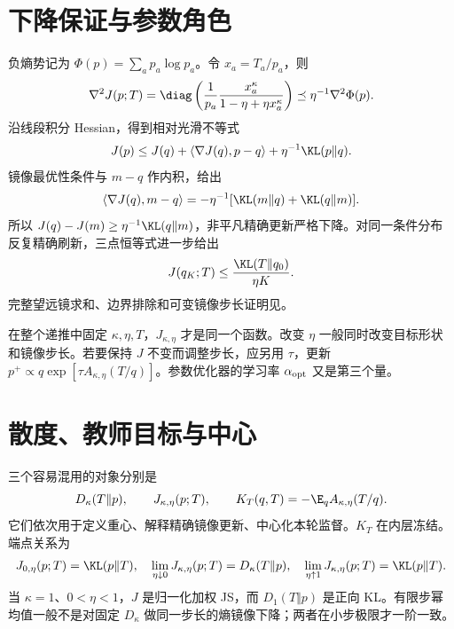 \section{下降保证与参数角色}
负熵势记为 $\Phi(p)=\sum_ap_a\log p_a$。令 $x_a=T_a/p_a$，则
\begin{equation}
\nabla^2J(p;T)
=\diag\left(\frac1{p_a}\frac{x_a^\kappa}{1-\eta+\eta x_a^\kappa}\right)
\preceq\eta^{-1}\nabla^2\Phi(p).
\label{eq:relative-smooth}
\end{equation}
沿线段积分 Hessian，得到相对光滑不等式
\begin{equation}
J(p)\le J(q)+\langle\nabla J(q),p-q\rangle+\eta^{-1}\KL(p\Vert q).
\end{equation}
镜像最优性条件与 $m-q$ 作内积，给出
\begin{equation}
\langle\nabla J(q),m-q\rangle
=-\eta^{-1}[\KL(m\Vert q)+\KL(q\Vert m)].
\end{equation}
所以 $J(q)-J(m)\ge\eta^{-1}\KL(q\Vert m)$，非平凡精确更新严格下降。对同一条件分布反复精确刷新，三点恒等式进一步给出
\begin{equation}
J(q_K;T)\le\frac{\KL(T\Vert q_0)}{\eta K}.
\label{eq:J-rate}
\end{equation}
完整望远镜求和、边界排除和可变镜像步长证明见。

在整个递推中固定 $\kappa,\eta,T$，$J_{\kappa,\eta}$ 才是同一个函数。改变 $\eta$ 一般同时改变目标形状和镜像步长。若要保持 $J$ 不变而调整步长，应另用 $\tau$，更新 $p^+\propto q\exp[\tau A_{\kappa,\eta}(T/q)]$。参数优化器的学习率 $\alpha_{\rm opt}$ 又是第三个量。

\section{散度、教师目标与中心}
三个容易混用的对象分别是
\begin{equation}
D_\kappa(T\Vert p),\qquad J_{\kappa,\eta}(p;T),\qquad
K_T(q,T)=-\E_q A_{\kappa,\eta}(T/q).
\end{equation}
它们依次用于定义重心、解释精确镜像更新、中心化本轮监督。$K_T$ 在内层冻结。端点关系为
\begin{equation}
J_{0,\eta}(p;T)=\KL(p\Vert T),\quad
\lim_{\eta\downarrow0}J_{\kappa,\eta}(p;T)=D_\kappa(T\Vert p),\quad
\lim_{\eta\uparrow1}J_{\kappa,\eta}(p;T)=\KL(p\Vert T).
\end{equation}
当 $\kappa=1$、$0<\eta<1$，$J$ 是归一化加权 JS，而 $D_1(T\Vert p)$ 是正向 KL。有限步幂均值一般不是对固定 $D_\kappa$ 做同一步长的熵镜像下降；两者在小步极限才一阶一致。
